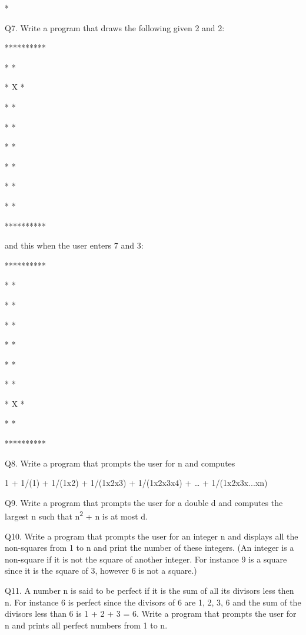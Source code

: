 \documentclass[
]{article}
\begin{document}
*

Q7. Write a program that draws the following given 2 and 2:

**********

* *

* X *

* *

* *

* *

* *

* *

* *

**********

and this when the user enters 7 and 3:

**********

* *

* *

* *

* *

* *

* *

* X *

* *

**********

Q8. Write a program that prompts the user for n and computes

1 + 1/(1) + 1/(1x2) + 1/(1x2x3) + 1/(1x2x3x4) + \ldots{} +
1/(1x2x3x...xn)

Q9. Write a program that prompts the user for a double d and computes
the largest n such that n\textsuperscript{2} + n is at most d.

Q10. Write a program that prompts the user for an integer n and displays
all the non-squares from 1 to n and print the number of these integers.
(An integer is a non-square if it is not the square of another integer.
For instance 9 is a square since it is the square of 3, however 6 is not
a square.)

Q11. A number n is said to be perfect if it is the sum of all its
divisors less then n. For instance 6 is perfect since the divisors of 6
are 1, 2, 3, 6 and the sum of the divisors less than 6 is 1 + 2 + 3 = 6.
Write a program that prompts the user for n and prints all perfect
numbers from 1 to n.
\end{document}
